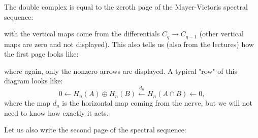 \documentclass{article}
\begin{document}
\noindent
The double complex is equal to the zeroth page of the Mayer-Vietoris spectral sequence:

\begin{center}\end{center}

\noindent
with the vertical maps come from the differentials $C_q \to C_{q-1}$ (other vertical maps are zero and not displayed).
This also tells us (also from the lectures) how the first page looks like:

\begin{center}\end{center}

\noindent
where again, only the nonzero arrows are displayed.
A typical "{}row"{} of this diagram looks like:
\begin{equation*}
0 \leftarrow H_n(A) \oplus H_n(B) \xleftarrow{d_n} H_n(A \cap B) \leftarrow 0,
\end{equation*}
where the map $d_n$ is the horizontal map coming from the nerve, but we will not need to know how exactly it acts.

\noindent
Let us also write the second page of the spectral sequence:

\begin{center}\end{center}
\end{document}
